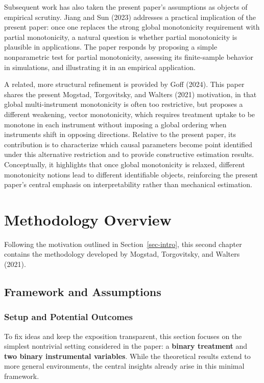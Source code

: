 \documentclass[
  12pt,
  a4paper,
  oneside]{article}
\begin{document}
Subsequent work has also taken the present paper's assumptions as
objects of empirical scrutiny. Jiang and Sun (2023) addresses a
practical implication of the present paper: once one replaces the strong
global monotonicity requirement with partial monotonicity, a natural
question is whether partial monotonicity is plausible in applications.
The paper responds by proposing a simple nonparametric test for partial
monotonicity, assessing its finite-sample behavior in simulations, and
illustrating it in an empirical application.

A related, more structural refinement is provided by Goff (2024). This
paper shares the present Mogstad, Torgovitsky, and Walters (2021)
motivation, in that global multi-instrument monotonicity is often too
restrictive, but proposes a different weakening, vector monotonicity,
which requires treatment uptake to be monotone in each instrument
without imposing a global ordering when instruments shift in opposing
directions. Relative to the present paper, its contribution is to
characterize which causal parameters become point identified under this
alternative restriction and to provide constructive estimation results.
Conceptually, it highlights that once global monotonicity is relaxed,
different monotonicity notions lead to different identifiable objects,
reinforcing the present paper's central emphasis on interpretability
rather than mechanical estimation.

\section{Methodology Overview}\label{methodology-overview}

Following the motivation outlined in Section~\ref{sec-intro}, this
second chapter contains the methodology developed by Mogstad,
Torgovitsky, and Walters (2021).

\subsection{Framework and Assumptions}\label{framework-and-assumptions}

\subsubsection{Setup and Potential
Outcomes}\label{setup-and-potential-outcomes}

To fix ideas and keep the exposition transparent, this section focuses
on the simplest nontrivial setting considered in the paper: a
\textbf{binary treatment} and
\textbf{two binary instrumental variables}. While the theoretical
results extend to more general environments, the central insights
already arise in this minimal framework.
\end{document}
